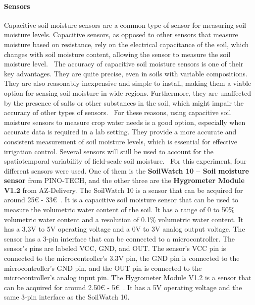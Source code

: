 \documentclass[11pt]{scrartcl} %
\begin{document}
\paragraph{Sensors}
\label{sec:sensors}
Capacitive soil moisture sensors are a common type of sensor for measuring soil moisture levels. Capacitive sensors, as opposed to other sensors that measure moisture based on resistance, rely on the electrical capacitance of the soil, which changes with soil moisture content, allowing the sensor to measure the soil moisture level.~\parencite{sensor_types}
\newline The accuracy of capacitive soil moisture sensors is one of their key advantages. They are quite precise, even in soils with variable compositions. They are also reasonably inexpensive and simple to install, making them a viable option for sensing soil moisture in wide regions. Furthermore, they are unaffected by the presence of salts or other substances in the soil, which might impair the accuracy of other types of sensors.~\parencite{sensor_types}
\newline For these reasons, using capacitive soil moisture sensors to measure crop water needs is a good option, especially when accurate data is required in a lab setting. They provide a more accurate and consistent measurement of soil moisture levels, which is essential for effective irrigation control. Several sensors will still be used to account for the spatiotemporal variability of field-scale soil moisture.~\parencite{sensor_types, smart_irrigation_using_sensor_and_weather}
\newline For this experiment, four different sensors were used. One of them is the \textbf{SoilWatch 10 – Soil moisture sensor} from PINO-TECH, and the other three are the \textbf{Hygrometer Module V1.2} from AZ-Delivery. 
\newline The SoilWatch 10 is a sensor that can be acquired for around 25€ - 33€~\parencite{pino_tech_soilwatch_10}. It is a capacitive soil moisture sensor that can be used to measure the volumetric water content of the soil. It has a range of 0 to 50\% volumetric water content and a resolution of 0.1\% volumetric water content. It has a 3.3V to 5V operating voltage and a 0V to 3V analog output voltage. The sensor has a 3-pin interface that can be connected to a microcontroller. The sensor's pins are labeled VCC, GND, and OUT. The sensor's VCC pin is connected to the microcontroller's 3.3V pin, the GND pin is connected to the microcontroller's GND pin, and the OUT pin is connected to the microcontroller's analog input pin. 
\newline The Hygrometer Module V1.2 is a sensor that can be acquired for around 2.50€ - 5€~\parencite{az_delivery_hygrometer_module_v1_2}. It has a 5V operating voltage and the same 3-pin interface as the SoilWatch 10.
\end{document}
